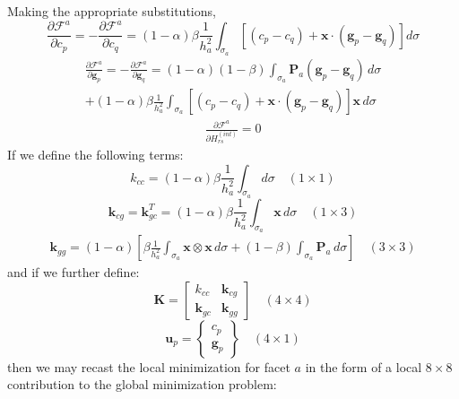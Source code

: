 \documentclass[11pt]{article} %
\begin{document}
Making the appropriate substitutions,
\begin{equation}
	\frac{\partial \mathcal{F}^a}{\partial c_p} = - \frac{\partial \mathcal{F}^a}{\partial c_q} = (1-\alpha) \beta \frac{1}{h_a^2} \int_{\sigma_a} \left[ (c_p - c_q) + \mathbf{x} \cdot (\mathbf{g}_p - \mathbf{g}_q) \right] d \sigma
\end{equation}
\begin{eqnarray}
	\frac{\partial \mathcal{F}^a}{\partial \mathbf{g}_p} = - \frac{\partial \mathcal{F}^a}{\partial \mathbf{g}_q} = (1-\alpha)(1-\beta) \int_{\sigma_a} \mathbf{P}_a ( \mathbf{g}_p - \mathbf{g}_q ) \, d \sigma \nonumber \\ + (1-\alpha) \beta \frac{1}{h_a^2} \int_{\sigma_a} \left[ (c_p - c_q) + \mathbf{x} \cdot (\mathbf{g}_p - \mathbf{g}_q) \right] \mathbf{x} \, d \sigma
\end{eqnarray}
\begin{eqnarray}
	\frac{\partial \mathcal{F}^a}{\partial H^{(int)}_{rs}} = 0
\end{eqnarray}
If we define the following terms:
\begin{equation}
	k_{cc} = (1-\alpha) \beta \frac{1}{h_a^2} \int_{\sigma_a} d \sigma \quad (1 \times 1)
\end{equation}
\begin{equation}
	\mathbf{k}_{cg} = \mathbf{k}^T_{gc} = (1-\alpha) \beta \frac{1}{h_a^2} \int_{\sigma_a} \mathbf{x} \, d \sigma \quad (1 \times 3)
\end{equation}
\begin{eqnarray}
	\mathbf{k}_{gg} = (1-\alpha) \left[ \beta \frac{1}{h_a^2} \int_{\sigma_a} \mathbf{x} \otimes \mathbf{x} \, d \sigma + (1-\beta) \int_{\sigma_a} \mathbf{P}_a \, d \sigma \right] \quad (3 \times 3)
\end{eqnarray}
and if we further define:
\begin{equation}
	\mathbf{K} = \left[ \begin{array}{cc} k_{cc} & \mathbf{k}_{cg} \\ \mathbf{k}_{gc} & \mathbf{k}_{gg} \end{array} \right] \quad (4 \times 4)
\end{equation}
\begin{equation}
	\mathbf{u}_p = \left\{ \begin{array}{c} c_p \\ \mathbf{g}_p \end{array} \right\} \quad (4 \times 1)
\end{equation}
then we may recast the local minimization for facet $a$ in the form of a local $8\times8$ contribution to the global minimization problem:
\end{document}

